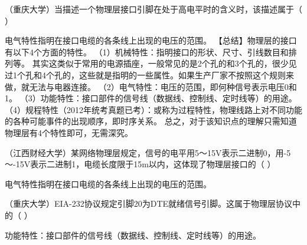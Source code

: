 \question （重庆大学）当描述一个物理层接口引脚在处于高电平时的含义时，该描述属于（
）
\par{}
\begin{solution}电气特性指明在接口电缆的各条线上出现的电压的范围。
【总结】物理层的接口有以下4个方面的特性。
（1）机械特性：指明接口的形状、尺寸、引线数目和排列等。
其实这类似于常用的电源插座，一般常见的是2个孔的和3个孔的，很少见过1个孔和4个孔的，这些就是指明的一些属性。如果生产厂家不按照这个规则来做，就无法与电器连接。
（2）电气特性：电压的范围，即何种信号表示电压0和1。
（3）功能特性：接口部件的信号线（数据线、控制线、定时线等）的用途。
（4）规程特性（2012年统考真题已考）：或称为过程特性，物理线路上对不同功能的各种可能事件的出现顺序，即时序关系。
总之，对于该知识点的理解只需知道物理层有4个特性即可，无需深究。
\end{solution}
\question （江西财经大学）某网络物理层规定，信号的电平用5～15V表示二进制0，用-5～-15V表示二进制1，电缆长度限于15m以内，这体现了物理层接口的（
）
\par{}
\begin{solution}电气特性指明在接口电缆的各条线上出现的电压的范围。
\end{solution}
\question （重庆大学）EIA-232协议规定引脚20为DTE就绪信号引脚。这属于物理层协议中的（
）
\par{}
\begin{solution}功能特性：接口部件的信号线（数据线、控制线、定时线等）的用途。
\end{solution}
